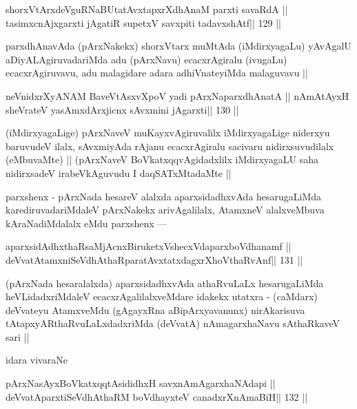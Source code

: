 \begin{shl}
shorxVtArxdeVguRNaBUtatAvxtapxrXdhAnaM parxti savaRdA ||
tasimxcnAjxgarxti jAgatiR supetxV savxpiti tadavxshAtf\hfill || 129 ||
\end{shl}

\begin{artha}
parxdhAnavAda (pArxNakekx) shorxVtarx muMtAda (iMdirxyagaLu) yAvAgalU aDiyALAgiruvadariMda adu (pArxNavu) ecacxrAgiralu (ivugaLu) ecacxrAgiruvavu, adu malagidare adara adhiVnateyiMda malaguvavu ||
\end{artha}

\begin{shl}
neVnidxrXyANAM BaveVtAsxvXpoV yadi pArxNaparxdhAnatA ||
nAmAtAyxH sheVrateV yasAmxdArxjicnx sAvxmini jAgarxti\hfill || 130 ||
\end{shl}

\begin{artha}
(iMdirxyagaLige) pArxNaveV muKayxvAgiruvalilx iMdirxyagaLige niderxyu baruvudeV ilalx, sAvxmiyAda rAjanu ecacxrAgiralu sacivaru nidirxsuvudilalx (eMbuvaMte) || (pArxNaveV BoVkatxqqvAgidadxlilx iMdirxyagaLU saha nidirxsadeV irabeVkAguvudu I daqSATxMtadaMte ||
\end{artha}

\begin{artha}
parxshenx - pArxNada hesareV alalxda aparxsidadhxvAda hesarugaLiMda karediruvadariMdaleV pArxNakekx arivAgalilalx, AtamxneV alalxveMbuva kAraNadiMdalalx eMdu parxshenx ---
\end{artha}

\begin{shl}
aparxsidAdhxthaRsaMjAcnxBiruketxVshecxVdaparxboVdhanamf ||
deVvatAtamxniSeVdhAthaRparatAvxtatxdagxrXhoV\s thaRvAnf\hfill || 131 ||
\end{shl}

\begin{artha}
(pArxNada hesaralalxda) aparxsidadhxvAda athaRvuLaLx hesarugaLiMda 
heVLidadxriMdaleV ecacxrAgalilalxveMdare idakekx utatxra - (caMdarx) deVvateyu AtamxveMdu (gAgayxRna aBipArxyavanunx) nirAkarisuva tAtapxyARthaRvuLaLxdadxriMda (deVvatA) nAmagarxhaNavu sAthaRkaveV sari ||
\end{artha}

\begin{artha}
idara vivaraNe
\end{artha}

\begin{shl}
pArxNasAyxBoVkatxqqtAsididhxH savxnAmAgarxhaNAdapi ||
deVvatAparxtiSeVdhAthaRM boVdhayxteV  canadxrXnAmaBiH\hfill || 132 ||
\end{shl}

